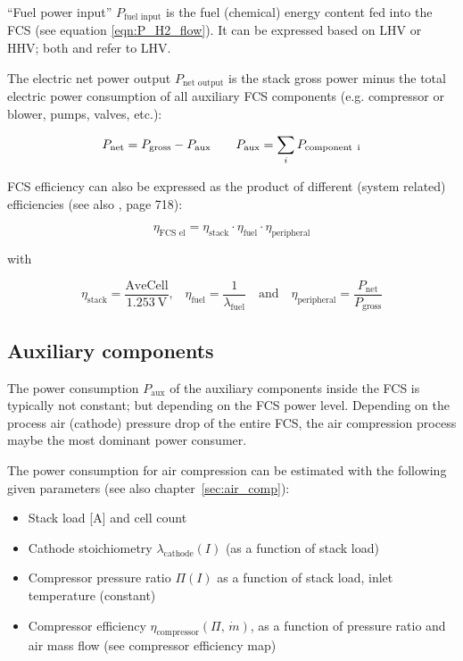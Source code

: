\documentclass[11pt,a4paper,english,twoside]{scrreprt}
\begin{document}
``Fuel power input'' $P_\text{fuel input}$ is the fuel (chemical) energy content fed into the FCS (see equation \ref{eqn:P_H2_flow}). It can be expressed based on LHV or HHV; both \cite{HFC} and \cite{SAEJ2615} refer to LHV.

The electric net power output $P_\text{net output}$ is the stack gross power minus the total electric power consumption of all auxiliary FCS components (e.g. compressor or blower, pumps, valves, etc.):

\[P_\text{net} = P_\text{gross} - P_\text{aux} \qquad P_\text{aux} = \sum_{i}P_\text{component\, i}\]

FCS efficiency can also be expressed as the product of different (system related) efficiencies (see also \cite{HFC}, page 718):

\[\eta_\text{FCS el} =\eta_\text{stack} \cdot \eta_\text{fuel} \cdot \eta_\text{peripheral} \]

with

\[\eta_\text{stack} =\frac{\text{AveCell}}{\SI{1.253}{\volt}} \mbox{,} \quad \eta_\text{fuel} =\frac{1}{\lambda_\text{fuel}} \quad \mbox{and} \quad \eta_\text{peripheral} =\frac{P_\text{net}}{P_\text{gross}}\]


\subsection{Auxiliary components}

The power consumption $P_\text{aux}$ of the auxiliary components inside the FCS is typically not constant; but depending on the FCS power level. Depending on the process air (cathode) pressure drop of the entire FCS, the air compression process maybe the most dominant power consumer. 

The power consumption for air compression can be estimated with the following given parameters (see also chapter~\ref{sec:air_comp}):

\begin{itemize}
	\item Stack load [A] and cell count
	\item Cathode stoichiometry $\lambda_\text{cathode}(I)$ (as a function of stack load)
	\item Compressor pressure ratio $\Pi(I)$ as a function of stack load, inlet temperature (constant)
	\item Compressor efficiency $\eta_\text{compressor}(\Pi,\,\dot{m})$, as a function of pressure ratio and air mass flow (see compressor efficiency map)
\end{itemize}
\end{document}
